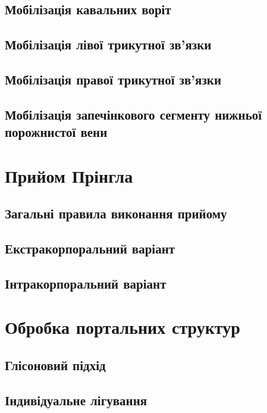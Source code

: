 \begin{refsection}
\subsection{Мобілізація кавальних воріт}

\subsection{Мобілізація лівої трикутної зв'язки}

\subsection{Мобілізація правої трикутної зв'язки}

\subsection{Мобілізація запечінкового сегменту нижньої порожнистої вени}

\section{Прийом Прінгла}

\subsection{Загальні правила виконання прийому}

\subsection{Екстракорпоральний варіант}

\subsection{Інтракорпоральний варіант}

\section{Обробка портальних структур}

\subsection{Глісоновий підхід}

\subsection{Індивідуальне лігування}


\end{refsection}
